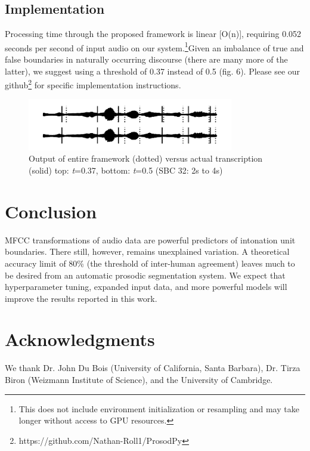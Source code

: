 \documentclass[conference]{IEEEtran}
\begin{document}
\subsection{Implementation}\label{AA}

Processing time through the proposed framework is linear [O(n)], requiring 0.052 seconds per second of input audio on our system.\footnote{This does not include environment initialization or resampling and may take longer without access to GPU resources.}Given an imbalance of true and false boundaries in naturally occurring discourse (there are many more of the latter), we suggest using a threshold of 0.37 instead of 0.5 (fig. 6). Please see our github\footnote{https://github.com/Nathan-Roll1/ProsodPy} for specific implementation instructions.

\begin{figure}[htbp]
\centerline{\includegraphics[width=90mm]{implementation.png}}
\caption{Output of entire framework (dotted) versus actual transcription (solid)  top: \emph{t}=0.37,  bottom: \emph{t}=0.5 (SBC 32: 2s to 4s)}
\label{fig}
\end{figure}


\section{Conclusion}
MFCC transformations of audio data are powerful predictors of intonation unit boundaries. There still, however, remains unexplained variation. A theoretical accuracy limit of 80\% (the threshold of inter-human agreement) \cite{b3} leaves much to be desired from an automatic prosodic segmentation system. We expect that hyperparameter tuning, expanded input data, and more powerful models will improve the results reported in this work.


\section*{Acknowledgments}

We thank Dr. John Du Bois (University of California, Santa Barbara), Dr. Tirza Biron (Weizmann Institute of Science), and the University of Cambridge.
\end{document}
